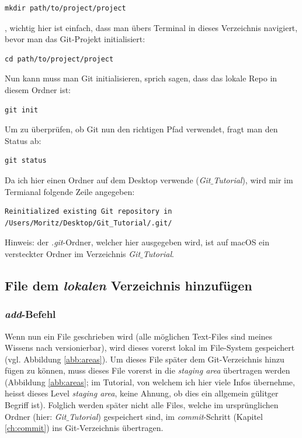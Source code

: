 \documentclass[twoside, 11pr]{article}
\begin{document}
\begin{lstlisting}
mkdir path/to/project/project
\end{lstlisting}

\noindent
, wichtig hier ist einfach, dass man übers Terminal in dieses Verzeichnis navigiert, bevor man das Git-Projekt initialisiert:

\begin{lstlisting}
cd path/to/project/project
\end{lstlisting}

\noindent
Nun kann muss man Git initialisieren, sprich sagen, dass das lokale Repo in diesem Ordner ist:

\begin{lstlisting}
git init
\end{lstlisting}

\noindent
Um zu überprüfen, ob Git nun den richtigen Pfad verwendet, fragt man den Status ab:

\begin{lstlisting}
git status
\end{lstlisting}

\noindent
Da ich hier einen Ordner auf dem Desktop verwende (\textit{Git$\_$Tutorial}), wird mir im Termianal folgende Zeile angegeben:

\begin{lstlisting}
Reinitialized existing Git repository in /Users/Moritz/Desktop/Git_Tutorial/.git/
\end{lstlisting}

\noindent
Hinweis: der \textit{.git}-Ordner, welcher hier ausgegeben wird, ist auf macOS ein versteckter Ordner im Verzeichnis \textit{Git$\_$Tutorial}.

\subsection{File dem \textit{lokalen} Verzeichnis hinzufügen}\label{ch:push}

\subsubsection{\textit{add}-Befehl}

Wenn nun ein File geschrieben wird (alle möglichen Text-Files sind meines Wissens nach versionierbar), wird dieses vorerst lokal im File-System gespeichert (vgl. Abbildung \ref{abb:areas}). Um dieses File später dem Git-Verzeichnis hinzu fügen zu können, muss dieses File vorerst in die \textit{staging area} übertragen werden (Abbildung \ref{abb:areas}; im Tutorial, von welchem ich hier viele Infos übernehme, heisst dieses Level \textit{staging area}, keine Ahnung, ob dies ein allgemein gülitger Begriff ist). Folglich werden später nicht alle Files, welche im ursprünglichen Ordner (hier: \textit{Git$\_$Tutorial}) gespeichert sind, im \textit{commit}-Schritt (Kapitel \ref{ch:commit}) ins Git-Verzeichnis übertragen.
\end{document}
